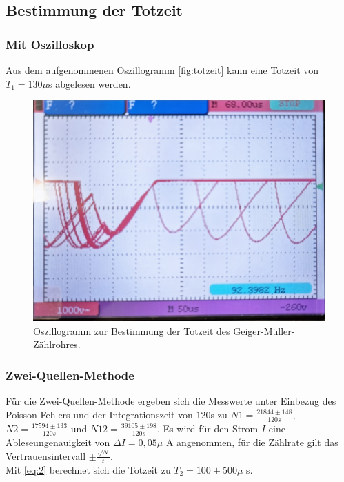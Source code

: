 \subsection{Bestimmung der Totzeit}
\subsubsection{Mit Oszilloskop}
Aus dem aufgenommenen Oszillogramm \autoref{fig:totzeit} kann eine Totzeit von 
$T_1 = 130 \mu$s abgelesen werden.\\
\begin{figure}[H]
  \centering
  \includegraphics[width = \textwidth]{content/totzeit.jpg}
  \caption{Oszillogramm zur Bestimmung der Totzeit des Geiger-Müller-Zählrohres.}
  \label{fig:totzeit}
\end{figure}

\subsubsection{Zwei-Quellen-Methode}
 Für die Zwei-Quellen-Methode ergeben sich die Messwerte unter Einbezug des 
 Poisson-Fehlers und der Integrationszeit von $120$s zu $N1 = \frac{21844 \pm 148}{120s}$, $N2 = \frac{17594 \pm 133}{120s}$ 
 und $N12 = \frac{39105 \pm 198}{120s}$.
 Es wird für den Strom $I$ eine Ableseungenauigkeit von $\Delta I = 0,05 \mu$ A angenommen, für die Zählrate 
 gilt das Vertrauensintervall $\pm \frac{\sqrt{N}}{t}$.\\
 Mit \autoref{eq:2} berechnet sich die Totzeit zu $T_2 = 100 \pm 500 \mu$ s.




